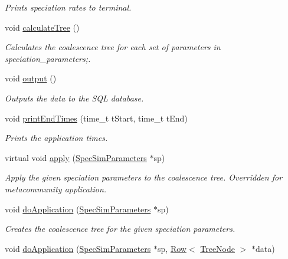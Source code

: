 \begin{DoxyCompactItemize}
\begin{DoxyCompactList}\small\item\em Prints speciation rates to terminal. \end{DoxyCompactList}\item 
void \hyperlink{group___community_objects_adfa9a1c84bb326092805614ad195fcdd}{calculate\+Tree} ()\hypertarget{group___community_objects_adfa9a1c84bb326092805614ad195fcdd}{}\label{group___community_objects_adfa9a1c84bb326092805614ad195fcdd}

\begin{DoxyCompactList}\small\item\em Calculates the coalescence tree for each set of parameters in speciation\+\_\+parameters;. \end{DoxyCompactList}\item 
void \hyperlink{group___community_objects_ad2483623c7ad7a11564fc49305204585}{output} ()
\begin{DoxyCompactList}\small\item\em Outputs the data to the S\+QL database. \end{DoxyCompactList}\item 
void \hyperlink{group___community_objects_a36216913433e3e011ee2420e83e1fe4a}{print\+End\+Times} (time\+\_\+t t\+Start, time\+\_\+t t\+End)
\begin{DoxyCompactList}\small\item\em Prints the application times. \end{DoxyCompactList}\item 
virtual void \hyperlink{group___community_objects_ac1dee14af27a0add712e257e316cadbf}{apply} (\hyperlink{struct_spec_sim_parameters}{Spec\+Sim\+Parameters} $\ast$sp)
\begin{DoxyCompactList}\small\item\em Apply the given speciation parameters to the coalescence tree. Overridden for metacommunity application. \end{DoxyCompactList}\item 
void \hyperlink{group___community_objects_a8ce443a30731d2249852d2b615f4a29a}{do\+Application} (\hyperlink{struct_spec_sim_parameters}{Spec\+Sim\+Parameters} $\ast$sp)
\begin{DoxyCompactList}\small\item\em Creates the coalescence tree for the given speciation parameters. \end{DoxyCompactList}\item 
void \hyperlink{group___community_objects_a7289dd39ee9b69ca314e1752a7b45701}{do\+Application} (\hyperlink{struct_spec_sim_parameters}{Spec\+Sim\+Parameters} $\ast$sp, \hyperlink{class_row}{Row}$<$ \hyperlink{class_tree_node}{Tree\+Node} $>$ $\ast$data)

\end{DoxyCompactItemize}
